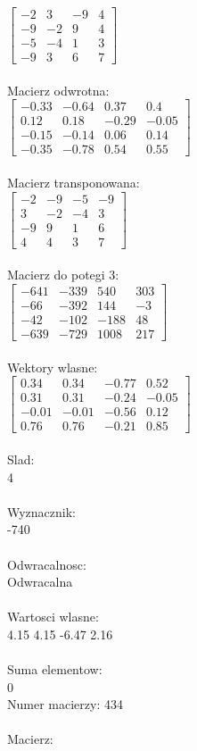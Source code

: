 \documentclass[a4paper,12pt]{article}
\begin{document}
$\begin{bmatrix} -2&3&-9&4\\-9&-2&9&4\\-5&-4&1&3\\-9&3&6&7 \end{bmatrix}$
\\
\\
Macierz odwrotna:\\

$\begin{bmatrix} -0.33&-0.64&0.37&0.4\\0.12&0.18&-0.29&-0.05\\-0.15&-0.14&0.06&0.14\\-0.35&-0.78&0.54&0.55 \end{bmatrix}$
\\
\\
Macierz transponowana:\\

$\begin{bmatrix} -2&-9&-5&-9\\3&-2&-4&3\\-9&9&1&6\\4&4&3&7 \end{bmatrix}$
\\
\\
Macierz do potegi 3:\\

$\begin{bmatrix} -641&-339&540&303\\-66&-392&144&-3\\-42&-102&-188&48\\-639&-729&1008&217 \end{bmatrix}$
\\
\\
Wektory wlasne:\\

$\begin{bmatrix} 0.34&0.34&-0.77&0.52\\0.31&0.31&-0.24&-0.05\\-0.01&-0.01&-0.56&0.12\\0.76&0.76&-0.21&0.85 \end{bmatrix}$
\\
\\
Slad:\\
4
\\
\\
Wyznacznik:\\
-740
\\
\\
Odwracalnosc:\\
Odwracalna
\\
\\
Wartosci wlasne:\\
4.15 4.15 -6.47 2.16
\\
\\
Suma elementow:\\
0
\\
\newpage
Numer macierzy:
434
\\
\\
Macierz:\\
\end{document}
